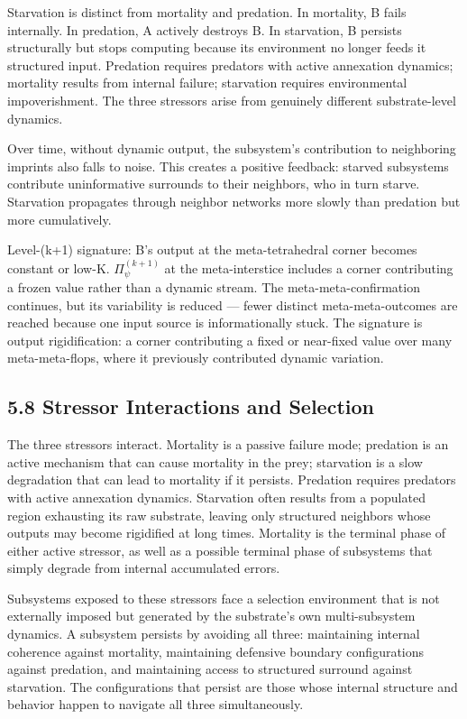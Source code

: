 \documentclass[11pt,oneside]{report}
\theoremstyle{definition}
\theoremstyle{remark}
\begin{document}
Starvation is distinct from mortality and predation. In mortality, B
fails internally. In predation, A actively destroys B. In starvation, B
persists structurally but stops computing because its environment no
longer feeds it structured input. Predation requires predators with
active annexation dynamics; mortality results from internal failure;
starvation requires environmental impoverishment. The three stressors
arise from genuinely different substrate-level dynamics.

Over time, without dynamic output, the subsystem's contribution to
neighboring imprints also falls to noise. This creates a positive
feedback: starved subsystems contribute uninformative surrounds to their
neighbors, who in turn starve. Starvation propagates through neighbor
networks more slowly than predation but more cumulatively.

Level-(k+1) signature: B's output at the meta-tetrahedral corner becomes
constant or low-K. \ensuremath{\Pi_{\psi}^{(k+1)}} at the meta-interstice includes a
corner contributing a frozen value rather than a dynamic stream. The
meta-meta-confirmation continues, but its variability is reduced ---
fewer distinct meta-meta-outcomes are reached because one input source
is informationally stuck. The signature is output rigidification: a
corner contributing a fixed or near-fixed value over many
meta-meta-flops, where it previously contributed dynamic variation.

\subsection*{5.8 Stressor Interactions and Selection}

The three stressors interact. Mortality is a passive failure mode;
predation is an active mechanism that can cause mortality in the prey;
starvation is a slow degradation that can lead to mortality if it
persists. Predation requires predators with active annexation dynamics.
Starvation often results from a populated region exhausting its raw
substrate, leaving only structured neighbors whose outputs may become
rigidified at long times. Mortality is the terminal phase of either
active stressor, as well as a possible terminal phase of subsystems that
simply degrade from internal accumulated errors.

Subsystems exposed to these stressors face a selection environment that
is not externally imposed but generated by the substrate's own
multi-subsystem dynamics. A subsystem persists by avoiding all three:
maintaining internal coherence against mortality, maintaining defensive
boundary configurations against predation, and maintaining access to
structured surround against starvation. The configurations that persist
are those whose internal structure and behavior happen to navigate all
three simultaneously.
\end{document}
